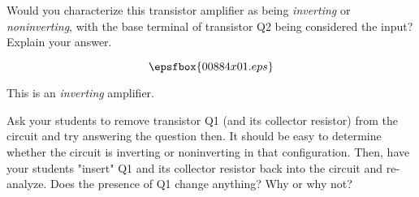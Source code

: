 

Would you characterize this transistor amplifier as being {\it inverting} or {\it noninverting}, with the base terminal of transistor Q2 being considered the input?  Explain your answer.

$$\epsfbox{00884x01.eps}$$







This is an {\it inverting} amplifier.







Ask your students to remove transistor Q1 (and its collector resistor) from the circuit and try answering the question then.  It should be easy to determine whether the circuit is inverting or noninverting in that configuration.  Then, have your students "insert" Q1 and its collector resistor back into the circuit and re-analyze.  Does the presence of Q1 change anything?  Why or why not?




